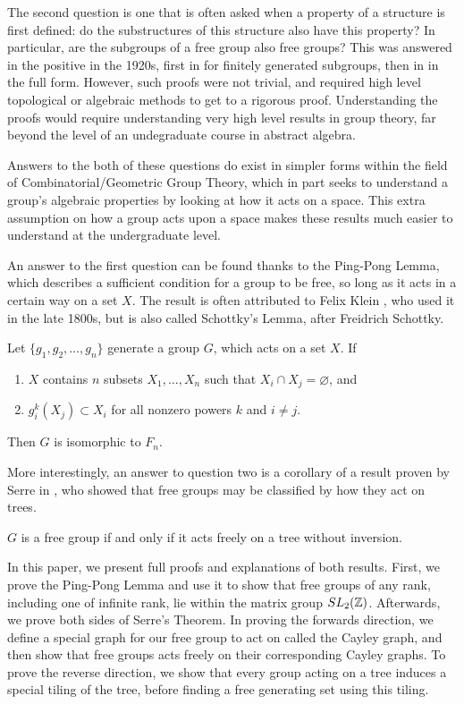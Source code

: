 The second question is one that is often asked when a property of a structure is first defined: do the substructures of this structure also have this property? In particular, are the subgroups of a free group also free groups? This was answered in the positive in the 1920s, first in \cite{Nielsen1921} for finitely generated subgroups, then in \cite{Schreier1928} in the full form. However, such proofs were not trivial, and required high level topological or algebraic methods to get to a rigorous proof. Understanding the proofs would require understanding very high level results in group theory, far beyond the level of an undegraduate course in abstract algebra. 

Answers to the both of these questions do exist in simpler forms within the field of Combinatorial/Geometric Group Theory, which in part seeks to understand a group's algebraic properties by looking at how it acts on a space. This extra assumption on how a group acts upon a space makes these results much easier to understand at the undergraduate level. 

An answer to the first question can be found thanks to the Ping-Pong Lemma, which describes a sufficient condition for a group to be free, so long as it acts in a certain way on a set $X$. The result is often attributed to Felix Klein \cite{delaHarpe2000}, who used it in the late 1800s, but is also called Schottky's Lemma, after Freidrich Schottky. 

\begin{thm}
    Let $\{g_1, g_2, \ldots, g_n\}$ generate a group $G$, which acts on a set $X$. If 

    \begin{enumerate}[label=(\roman*)]
        \item $X$ contains $n$ subsets $X_1, \ldots, X_n$ such that $X_i \cap X_j = \varnothing$, and
        \item $g_i^k(X_j) \subset X_i$ for all nonzero powers $k$ and $i \neq j$.
    \end{enumerate}

    Then $G$ is isomorphic to $F_n$. 
\end{thm}

More interestingly, an answer to question two is a corollary of a result proven by Serre in \cite{Serre1980}, who showed that free groups may be classified by how they act on trees.

\begin{thm}
    $G$ is a free group if and only if it acts freely on a tree without inversion. 
\end{thm}

In this paper, we present full proofs and explanations of both results. First, we prove the Ping-Pong Lemma and use it to show that free groups of any rank, including one of infinite rank, lie within the matrix group $SL_2(\mathbb{Z})$. Afterwards, we prove both sides of Serre's Theorem. In proving the forwards direction, we define a special graph for our free group to act on called the Cayley graph, and then show that free groups acts freely on their corresponding Cayley graphs. To prove the reverse direction, we show that every group acting on a tree induces a special tiling of the tree, before finding a free generating set using this tiling. 